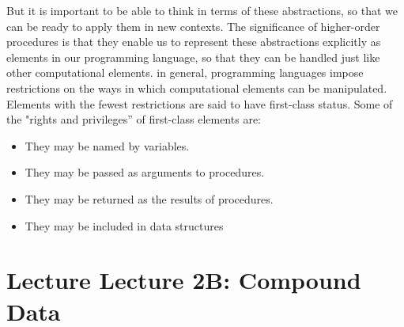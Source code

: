 \documentclass[a4paper,twoside]{article}
\numberwithin{equation}{section}
\begin{document}
But it is important to be able to think in
terms of these abstractions, so that we can be ready to apply them in
new contexts. The significance of higher-order procedures is that they
enable us to represent these abstractions explicitly as elements in our
programming language, so that they can be handled just like other computational elements. \newline
in general, programming languages impose restrictions on the ways
in which computational elements can be manipulated. Elements with
the fewest restrictions are said to have first-class status. Some of the
"rights and privileges” of first-class elements are:
\begin{itemize}
    \item They may be named by variables.
    \item They may be passed as arguments to procedures.
    \item They may be returned as the results of procedures.
    \item They may be included in data structures
\end{itemize}
\section{Lecture Lecture 2B: Compound Data}
\end{document}
